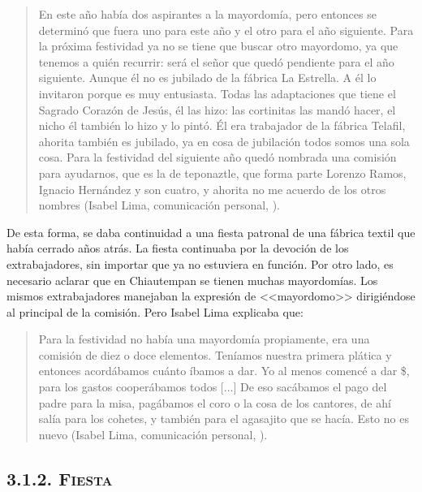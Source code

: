 \documentclass[14pt,letterpaper,twoside]{extbook} %
\begin{document}
\begin{quotation}
\noindent En este año había dos aspirantes a la mayordomía, pero entonces se determinó que fuera uno para este año y el otro para el año siguiente. Para la próxima festividad ya no se tiene que buscar otro mayordomo, ya que tenemos a quién recurrir: será el señor que quedó pendiente para el año siguiente. Aunque él no es jubilado de la fábrica La Estrella. A él lo invitaron porque es muy entusiasta. Todas las adaptaciones que tiene el Sagrado Corazón de Jesús, él las hizo: las cortinitas las mandó hacer, el nicho él también lo hizo y lo pintó. Él era trabajador de la fábrica Telafil, ahorita también es jubilado, ya en cosa de jubilación todos somos una sola cosa. Para la festividad del siguiente año quedó nombrada una comisión para ayudarnos, que es la de teponaztle, que forma parte Lorenzo Ramos, Ignacio Hernández y son cuatro, y ahorita no me acuerdo de los otros nombres (Isabel Lima, comunicación personal, ).
\end{quotation}

\noindent De esta forma, se daba continuidad a una fiesta patronal de una fábrica textil que había cerrado  años atrás. La fiesta continuaba por la devoción de los extrabajadores, sin importar que ya no estuviera en función. Por otro lado, es necesario aclarar que en Chiautempan se tienen muchas mayordomías. Los mismos extrabajadores manejaban la expresión de <<mayordomo>> dirigiéndose al principal de la comisión. Pero Isabel Lima explicaba que:

\begin{quotation}
\noindent Para la festividad no había una mayordomía propiamente, era una comisión de diez o doce elementos. Teníamos nuestra primera plática y entonces acordábamos cuánto íbamos a dar. Yo al menos comencé a dar \$, para los gastos cooperábamos todos [...] De eso sacábamos el pago del padre para la misa, pagábamos el coro o la cosa de los cantores, de ahí salía para los cohetes, y también para el agasajito que se hacía. Esto no es nuevo (Isabel Lima, comunicación personal, ).
\end{quotation}

\subsection*{\mdseries\large\textsc{3.1.2. Fiesta }}\label{Fiesta_2014}
\end{document}

